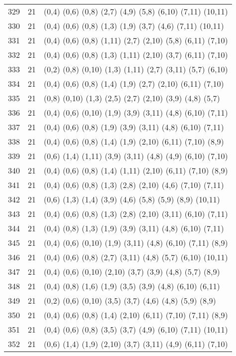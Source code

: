 {\begin{longtable}{lll}
329 & 21 & (0,4) (0,6) (0,8) (2,7) (4,9) (5,8) (6,10) (7,11) (10,11) \\
330 & 21 & (0,4) (0,6) (0,8) (1,3) (1,9) (3,7) (4,6) (7,11) (10,11) \\
331 & 21 & (0,4) (0,6) (0,8) (1,11) (2,7) (2,10) (5,8) (6,11) (7,10) \\
332 & 21 & (0,4) (0,6) (0,8) (1,3) (1,11) (2,10) (3,7) (6,11) (7,10) \\
333 & 21 & (0,2) (0,8) (0,10) (1,3) (1,11) (2,7) (3,11) (5,7) (6,10) \\
334 & 21 & (0,4) (0,6) (0,8) (1,4) (1,9) (2,7) (2,10) (6,11) (7,10) \\
335 & 21 & (0,8) (0,10) (1,3) (2,5) (2,7) (2,10) (3,9) (4,8) (5,7) \\
336 & 21 & (0,4) (0,6) (0,10) (1,9) (3,9) (3,11) (4,8) (6,10) (7,11) \\
337 & 21 & (0,4) (0,6) (0,8) (1,9) (3,9) (3,11) (4,8) (6,10) (7,11) \\
338 & 21 & (0,4) (0,6) (0,8) (1,4) (1,9) (2,10) (6,11) (7,10) (8,9) \\
339 & 21 & (0,6) (1,4) (1,11) (3,9) (3,11) (4,8) (4,9) (6,10) (7,10) \\
340 & 21 & (0,4) (0,6) (0,8) (1,4) (1,11) (2,10) (6,11) (7,10) (8,9) \\
341 & 21 & (0,4) (0,6) (0,8) (1,3) (2,8) (2,10) (4,6) (7,10) (7,11) \\
342 & 21 & (0,6) (1,3) (1,4) (3,9) (4,6) (5,8) (5,9) (8,9) (10,11) \\
343 & 21 & (0,4) (0,6) (0,8) (1,3) (2,8) (2,10) (3,11) (6,10) (7,11) \\
344 & 21 & (0,4) (0,8) (1,3) (1,9) (3,9) (3,11) (4,8) (6,10) (7,11) \\
345 & 21 & (0,4) (0,6) (0,10) (1,9) (3,11) (4,8) (6,10) (7,11) (8,9) \\
346 & 21 & (0,4) (0,6) (0,8) (2,7) (3,11) (4,8) (5,7) (6,10) (10,11) \\
347 & 21 & (0,4) (0,6) (0,10) (2,10) (3,7) (3,9) (4,8) (5,7) (8,9) \\
348 & 21 & (0,4) (0,8) (1,6) (1,9) (3,5) (3,9) (4,8) (6,10) (6,11) \\
349 & 21 & (0,2) (0,6) (0,10) (3,5) (3,7) (4,6) (4,8) (5,9) (8,9) \\
350 & 21 & (0,4) (0,6) (0,8) (1,4) (2,10) (6,11) (7,10) (7,11) (8,9) \\
351 & 21 & (0,4) (0,6) (0,8) (3,5) (3,7) (4,9) (6,10) (7,11) (10,11) \\
352 & 21 & (0,6) (1,4) (1,9) (2,10) (3,7) (3,11) (4,9) (6,11) (7,10) \\

\end{longtable}}
